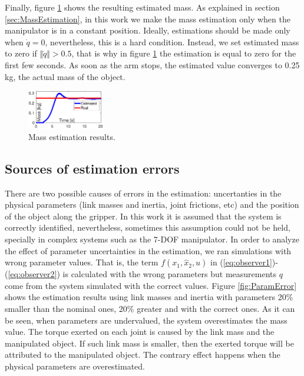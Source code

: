 \documentclass[conference,letterpaper]{ieeeconf}
\begin{document}
Finally, figure \ref{fig:MassEstimation} shows the resulting estimated mass. As explained in section \ref{sec:MassEstimation}, in this work we make the mass estimation only when the manipulator is in a constant position. Ideally, estimations should be made only when $\dot{q}=0$, nevertheless, this is a hard condition. Instead, we set estimated mass to zero if $\Vert\dot{q}\Vert > 0.5$, that is why in figure \ref{fig:MassEstimation} the estimation is equal to zero for the first few seconds. As soon as the arm stops, the estimated value converges to 0.25 kg, the actual mass of the object. 
\begin{figure}
  \centering
  \includegraphics[width=0.3\textwidth]{Figures/result_mass.eps}
  \caption{Mass estimation results.}
  \label{fig:MassEstimation}
\end{figure}

\subsection{Sources of estimation errors}
There are two possible causes of errors in the estimation: uncertanties in the physical parameters (link masses and inertia, joint frictions, etc) and the position of the object along the gripper. In this work it is assumed that the system is correctly identified, nevertheless, sometimes this assumption could not be held, specially in complex systems such as the 7-DOF manipulator. In order to analyze the effect of parameter uncertainties in the estimation, we ran simulations with wrong parameter values. That is, the term $f(x_1, \hat{x}_2, u)$ in (\ref{eq:observer1})-(\ref{eq:observer2}) is calculated with the wrong parameters but measurements $q$ come from the system simulated with the correct values. Figure \ref{fig:ParamError} shows the estimation results using link masses and inertia with parameters 20\% smaller than the nominal ones, 20\% greater and with the correct ones. As it can be seen, when parameters are undervalued, the system overestimates the mass value. The torque exerted on each joint is caused by the link mass and the manipulated object. If such link mass is smaller, then the exerted torque will be attributed to the manipulated object. The contrary effect happens when the physical parameters are overestimated.
\end{document}
